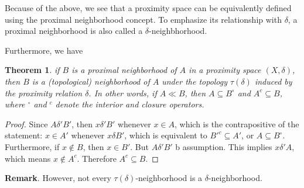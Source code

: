 \documentclass[12pt]{article}
\newtheorem{thm}{Theorem}
\begin{document}
Because of the above, we see that a proximity space can be equivalently defined using the proximal neighborhood concept.  To emphasize its relationship with $\delta$, a proximal neighborhood is also called a $\delta$-neighbhorhood.

Furthermore, we have 
\begin{thm}
if $B$ is a proximal neighborhood of $A$ in a proximity space $(X,\delta)$, then $B$ is a (topological) neighborhood of $A$ under the topology $\tau(\delta)$ induced by the proximity relation $\delta$.  In other words, if $A\ll B$, then $A\subseteq B^{\circ}$ and $A^c\subseteq B$, where $^{\circ}$ and $^c$ denote the interior and closure operators.
\end{thm}
\begin{proof}
Since $A\delta'B'$, then $x\delta'B'$ whenever $x\in A$, which is the contrapositive of the statement: $x\in A'$ whenever $x\delta B'$, which is equivalent to $B'^c\subseteq A'$, or $A\subseteq B^{\circ}$.  Furthermore, if $x\notin B$, then $x\in B'$.  But $A\delta'B'$ b assumption.  This implies $x\delta' A$, which means $x\notin A^c$.  Therefore $A^c\subseteq B$.
\end{proof}
\textbf{Remark}.  However, not every $\tau(\delta)$-neighborhood is a $\delta$-neighborhood.
\end{document}
